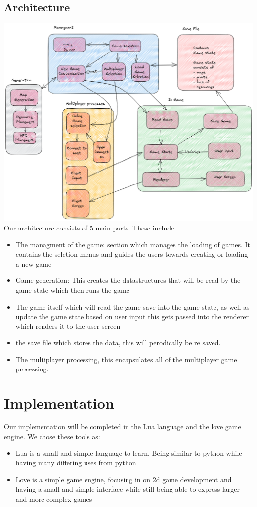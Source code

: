 \documentclass{article}
\begin{document}
\subsection{Architecture}%
\label{subsec:arch}
\includegraphics[scale=0.2]{architecture.png} \\
Our architecture consists of 5 main parts.
These include
\begin{itemize}
	\item The managment of the game: section which manages the loading of games. It contains the
	      selction menus and guides the users towards creating or loading a new
	      game
	\item Game generation: This creates the datastructures that will be read by
	      the game state which then runs the game
	\item The game itself which will read the game save into the game state,
	      as well as update the game state based on user input
	      this gets passed into the renderer which renders it to the user screen
	\item the save file which stores the data, this will perodically be re
	      saved.
	\item The multiplayer processing, this encapsulates all of the
	      multiplayer game processing.
\end{itemize}
\section{Implementation}%
\label{sec:impl}
Our implementation will be completed in the Lua language and the love game
engine. We chose these tools as:
\begin{itemize}
	\item Lua is a small and simple language to learn. Being similar to python while
	      having many differing uses from python
	\item Love is a simple game engine, focusing in on 2d game development and
	      having a small and simple interface while still being able to express
	      larger and more complex games
\end{itemize}
\end{document}
